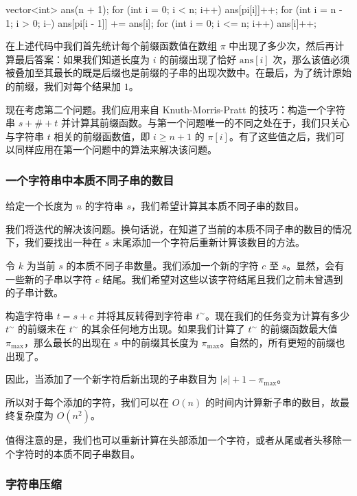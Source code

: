\begin{cppcode}
vector<int> ans(n + 1);
for (int i = 0; i < n; i++) ans[pi[i]]++;
for (int i = n - 1; i > 0; i--) ans[pi[i - 1]] += ans[i];
for (int i = 0; i <= n; i++) ans[i]++;
\end{cppcode}

在上述代码中我们首先统计每个前缀函数值在数组 $\pi$ 中出现了多少次，然后再计算最后答案：如果我们知道长度为 $i$ 的前缀出现了恰好 $\text{ans}[i]$ 次，那么该值必须被叠加至其最长的既是后缀也是前缀的子串的出现次数中。在最后，为了统计原始的前缀，我们对每个结果加 $1$。

现在考虑第二个问题。我们应用来自 Knuth-Morris-Pratt 的技巧：构造一个字符串 $s + \# + t$ 并计算其前缀函数。与第一个问题唯一的不同之处在于，我们只关心与字符串 $t$ 相关的前缀函数值，即 $i \ge n + 1$ 的 $\pi[i]$。有了这些值之后，我们可以同样应用在第一个问题中的算法来解决该问题。

\subsubsection{一个字符串中本质不同子串的数目}

给定一个长度为 $n$ 的字符串 $s$，我们希望计算其本质不同子串的数目。

我们将迭代的解决该问题。换句话说，在知道了当前的本质不同子串的数目的情况下，我们要找出一种在 $s$ 末尾添加一个字符后重新计算该数目的方法。

令 $k$ 为当前 $s$ 的本质不同子串数量。我们添加一个新的字符 $c$ 至 $s$。显然，会有一些新的子串以字符 $c$ 结尾。我们希望对这些以该字符结尾且我们之前未曾遇到的子串计数。

构造字符串 $t = s + c$ 并将其反转得到字符串 $t^{\sim}$。现在我们的任务变为计算有多少 $t^{\sim}$ 的前缀未在 $t^{\sim}$ 的其余任何地方出现。如果我们计算了 $t^{\sim}$ 的前缀函数最大值 $\pi_{\max}$，那么最长的出现在 $s$ 中的前缀其长度为 $\pi_{\max}$。自然的，所有更短的前缀也出现了。

因此，当添加了一个新字符后新出现的子串数目为 $|s| + 1 - \pi_{\max}$。

所以对于每个添加的字符，我们可以在 $O(n)$ 的时间内计算新子串的数目，故最终复杂度为 $O(n^2)$。

值得注意的是，我们也可以重新计算在头部添加一个字符，或者从尾或者头移除一个字符时的本质不同子串数目。

\subsubsection{字符串压缩}

